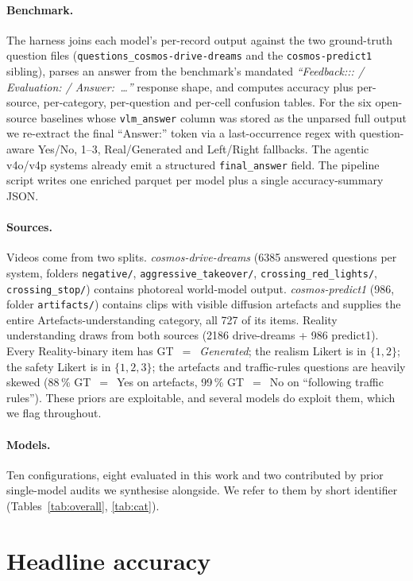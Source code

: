 \documentclass[11pt,a4paper]{article}
\providecommand{\num}[1]{#1}
\newcommand{\pct}[1]{#1\,\%}
\newcommand{\code}[1]{\texttt{#1}}
\begin{document}
\paragraph{Benchmark.} The harness joins each model's per-record
output against the two ground-truth question files
(\code{questions\_cosmos-drive-dreams} and the
\code{cosmos-predict1} sibling), parses an answer from the
benchmark's mandated \emph{``Feedback::: / Evaluation: /
Answer:~\dots''} response shape, and computes accuracy plus per-source,
per-category, per-question and per-cell confusion tables. For the
six open-source baselines whose \code{vlm\_answer} column was stored
as the unparsed full output we re-extract the final ``Answer:''
token via a last-occurrence regex with question-aware Yes/No, 1--3,
Real/Generated and Left/Right fallbacks. The agentic v4o/v4p systems
already emit a structured \code{final\_answer} field. The pipeline
script writes one enriched parquet per model plus a single
accuracy-summary JSON.

\paragraph{Sources.} Videos come from two splits.
\emph{cosmos-drive-dreams} (\num{6385} answered questions per system,
folders \code{negative/}, \code{aggressive\_takeover/},
\code{crossing\_red\_lights/}, \code{crossing\_stop/}) contains
photoreal world-model output. \emph{cosmos-predict1} (\num{986}, folder
\code{artifacts/}) contains clips with visible diffusion artefacts and
supplies the entire Artefacts-understanding category, all 727 of its
items. Reality understanding draws from both sources (2186
drive-dreams + 986 predict1). Every Reality-binary item has
GT~$=$~\emph{Generated}; the realism Likert is in $\{1,2\}$; the safety
Likert is in $\{1,2,3\}$; the artefacts and traffic-rules questions are
heavily skewed (\pct{88} GT~$=$~Yes on artefacts, \pct{99} GT~$=$~No on
``following traffic rules''). These priors are exploitable, and several
models do exploit them, which we flag throughout.

\paragraph{Models.} Ten configurations, eight evaluated in this work and
two contributed by prior single-model audits we synthesise alongside.
We refer to them by short identifier (Tables~\ref{tab:overall},
\ref{tab:cat}).

\section{Headline accuracy}
\label{sec:headline}
\end{document}
